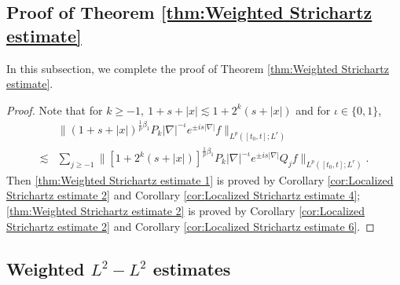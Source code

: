 \documentclass[11pt,twoside]{article}
\def\f{\frac}
\def\ls{\lesssim}
\theoremstyle{plain}
\theoremstyle{definition}
\numberwithin{equation}{section}
\begin{document}
\subsection{Proof of Theorem \ref{thm:Weighted Strichartz estimate}}\label{Proof-1}
In this subsection, we complete the proof of Theorem \ref{thm:Weighted Strichartz estimate}.
	\begin{proof}
		Note that for $k\ge-1,\ 1+s+|x|\ls 1+2^k(s+|x|)$ and for $\iota\in\{0,1\}$,
		\begin{equation*}
			\begin{split}
				&\|(1+s+|x|)^{\f{1}{p}\beta_1}P_{k}|\nabla|^{-\iota}e^{\pm is|\nabla|}f\|_{L^p([t_0,t];L^r)} \\
				\ls&
				\sum_{j\ge -1}\|[1+2^k(s+|x|)]^{\f{1}{p}\beta_1}P_{k}|\nabla|^{-\iota}e^{\pm is|\nabla|}Q_jf\|_{L^p([t_0,t];L^r)}.
			\end{split}
		\end{equation*}
		Then \eqref{thm:Weighted Strichartz estimate 1} is proved by Corollary \ref{cor:Localized Strichartz estimate 2} and Corollary \ref{cor:Localized Strichartz estimate 4}; \eqref{thm:Weighted Strichartz estimate 2} is proved by Corollary \ref{cor:Localized Strichartz estimate 2} and Corollary \ref{cor:Localized Strichartz estimate 6}.
	\end{proof}

	\subsection{Weighted $L^2-L^2$ estimates}\label{sec:Weighted L^2-L^2 estimates}
\end{document}
